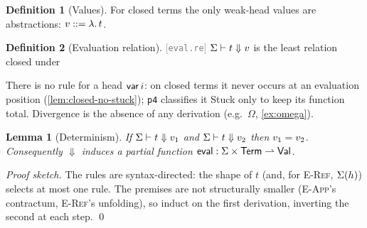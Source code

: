 \documentclass[11pt]{article}
\theoremstyle{definition}
\newtheorem{definition}{Definition}[section]
\theoremstyle{plain}
\newtheorem{lemma}[theorem]{Lemma}
\theoremstyle{remark}
\newcommand{\src}[1]{{\footnotesize\textcolor{gray}{[\texttt{#1}]}}}
\begin{document}
\begin{definition}[Values]\label{def:value}
For closed terms the only weak-head values are abstractions: $v ::= \lambda.\,t$.
\end{definition}

\begin{definition}[Evaluation relation]\label{def:eval}
\src{eval.re} $\Sigma \vdash t \Downarrow v$ is the least relation closed under
There is no rule for a head $\mathsf{var}\,i$: on closed terms it never occurs at an evaluation position
(\cref{lem:closed-no-stuck}); \texttt{p4} classifies it \textsf{Stuck} only to keep its function
total. Divergence is the absence of any derivation (e.g.\ $\Omega$, \cref{ex:omega}).
\end{definition}

\begin{lemma}[Determinism]\label{lem:determinism}
If $\Sigma \vdash t \Downarrow v_1$ and $\Sigma \vdash t \Downarrow v_2$ then $v_1 = v_2$.
Consequently $\Downarrow$ induces a partial function $\mathsf{eval} : \Sigma \times \mathsf{Term} \rightharpoonup
\mathsf{Val}$.
\end{lemma}
\begin{proof}[Proof sketch]
The rules are syntax-directed: the shape of $t$ (and, for \textsc{E-Ref}, $\Sigma(h)$) selects
at most one rule. The premises are not structurally smaller (\textsc{E-App}'s contractum,
\textsc{E-Ref}'s unfolding), so induct on the first derivation, inverting the second at each
step. \qed
\end{proof}
\end{document}

